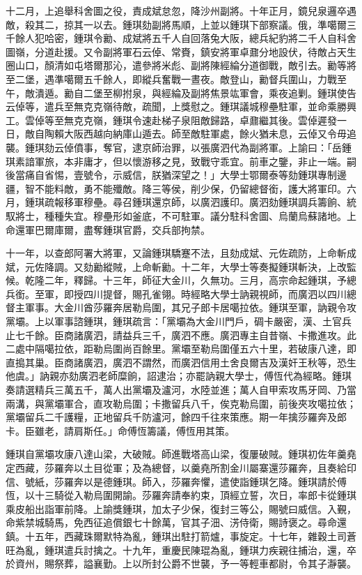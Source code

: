 \begin{pinyinscope}
十二月，上追舉科舍圖之役，責成斌怠忽，降沙州副將。十年正月，鏡兒泉邏卒遇敵，殺其二，掠其一以去。鍾琪劾副將馬順，上並以鍾琪下部察議。俄，準噶爾三千餘人犯哈密，鍾琪令勷、成斌將五千人自回落兔大阪，總兵紀豹將二千人自科舍圖嶺，分道赴援。又令副將軍石云倬、常賚，鎮安將軍卓鼐分地設伏，待敵占天生圈山口，顏清如屯塔爾那沁，遣參將米彪、副將陳經綸分道御戰，敵引去。勷等將至二堡，遇準噶爾五千餘人，即縱兵奮戰一晝夜。敵登山，勷督兵圍山，力戰至午，敵潰遁。勷自二堡至柳拊泉，與經綸及副將焦景竑軍會，乘夜追剿。鍾琪使告云倬等，遣兵至無克克嶺待敵，疏聞，上獎慰之。鍾琪議城穆壘駐軍，並命乘勝興工。雲倬等至無克克嶺，鍾琪令速赴梯子泉阻敵歸路，卓鼐繼其後。雲倬遲發一日，敵自陶賴大阪西越向納庫山遁去。師至敵駐軍處，餘火猶未息，云倬又令毋追襲。鍾琪劾云倬僨事，奪官，逮京師治罪，以張廣泗代為副將軍。上諭曰：「岳鍾琪素諳軍旅，本非庸才，但以懷游移之見，致戰守乖宜。前車之鑒，非止一端。嗣後當痛自省惕，壹號令，示威信，朕猶深望之！」大學士鄂爾泰等劾鍾琪專制邊疆，智不能料敵，勇不能殲敵。降三等侯，削少保，仍留總督銜，護大將軍印。六月，鍾琪疏報移軍穆壘。尋召鍾琪還京師，以廣泗護印。廣泗劾鍾琪調兵籌餉、統馭將士，種種失宜。穆壘形如釜底，不可駐軍。議分駐科舍圖、烏蘭烏蘇諸地。上命還軍巴爾庫爾，盡奪鍾琪官爵，交兵部拘禁。

十一年，以查郎阿署大將軍，又論鍾琪驕蹇不法，且劾成斌、元佐疏防，上命斬成斌，元佐降調。又劾勷縱賊，上命斬勷。十二年，大學士等奏擬鍾琪斬決，上改監候。乾隆二年，釋歸。十三年，師征大金川，久無功。三月，高宗命起鍾琪，予總兵銜。至軍，即授四川提督，賜孔雀翎。時經略大學士訥親視師，而廣泗以四川總督主軍事。大金川酋莎羅奔居勒烏圍，其兄子郎卡居噶拉依。鍾琪至軍，訥親令攻黨壩。上以軍事諮鍾琪，鍾琪疏言：「黨壩為大金川門戶，碉卡嚴密，漢、土官兵止七千餘。臣商諸廣泗，請益兵三千，廣泗不應。廣泗專主自昔嶺、卡撒進攻。此二處中隔噶拉依，距勒烏圍尚百餘里。黨壩至勒烏圍僅五六十里，若破康八達，即直搗其巢。臣商諸廣泗，廣泗不謂然，而廣泗信用土舍良爾吉及漢奸王秋等，恐生他虞。」訥親亦劾廣泗老師糜餉，詔逮治；亦罷訥親大學士，傅恆代為經略。鍾琪奏請選精兵三萬五千，萬人出黨壩及瀘河，水陸並進；萬人自甲索攻馬牙岡、乃當兩溝，與黨壩軍合，直攻勒烏圍；卡撒留兵八千，俟克勒烏圍，前後夾攻噶拉依；黨壩留兵二千護糧，正地留兵千防瀘河，餘四千往來策應。期一年擒莎羅奔及郎卡。臣雖老，請肩斯任。」命傅恆籌議，傅恆用其策。

鍾琪自黨壩攻康八達山梁，大破賊。師進戰塔高山梁，復屢破賊。鍾琪初佐年羹堯定西藏，莎羅奔以土目從軍；及為總督，以羹堯所割金川屬寨還莎羅奔，且奏給印信、號紙，莎羅奔以是德鍾琪。師入，莎羅奔懼，遣使詣鍾琪乞降。鍾琪請於傅恆，以十三騎從入勒烏圍開諭。莎羅奔請奉約束，頂經立誓，次日，率郎卡從鍾琪乘皮船出詣軍前降。上諭獎鍾琪，加太子少保，復封三等公，賜號曰威信。入覲，命紫禁城騎馬，免西征追償銀七十餘萬，官其子沺、淓侍衛，賜詩褒之。尋命還鎮。十五年，西藏珠爾默特為亂，鍾琪出駐打箭爐，事旋定。十七年，雜穀土司蒼旺為亂，鍾琪遣兵討擒之。十九年，重慶民陳琨為亂，鍾琪力疾親往捕治，還，卒於資州，賜祭葬，謚襄勤。上以所封公爵不世襲，予一等輕車都尉，令其子瀞襲。


\end{pinyinscope}
